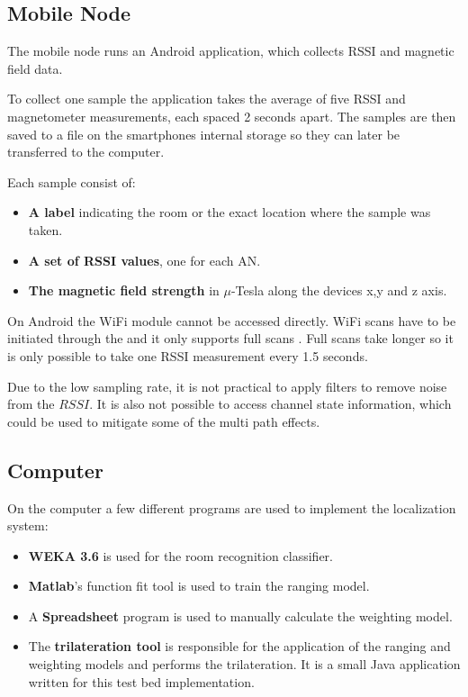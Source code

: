 \subsection{Mobile Node}

The mobile node runs an Android application, which collects RSSI and magnetic field data.

To collect one sample the application takes the average of five RSSI and magnetometer measurements, each spaced 2 seconds apart. The samples are then saved to a  file on the smartphones internal storage so they can later be transferred to the computer.

Each sample consist of:
\begin{itemize}
\item \textbf{A label} indicating the room or the exact location where the sample was taken.
\item \textbf{A set of RSSI values}, one for each AN.
\item \textbf{The magnetic field strength} in \(\mu\)-Tesla along the devices x,y and z axis.
\end{itemize}

On Android the WiFi module cannot be accessed directly. WiFi scans have to be initiated through the  and it only supports full scans \cite{brouwers2014incremental}. Full scans take longer so it is only possible to take one RSSI measurement every 1.5 seconds.

Due to the low sampling rate, it is not practical to apply filters to remove noise from the $RSSI$. It is also not possible to access channel state information, which could be used to mitigate some of the multi path effects.

\subsection{Computer}

On the computer a few different programs are used to implement the localization system:
\begin{itemize}
\item \textbf{WEKA 3.6} is used for the room recognition classifier.

\item \textbf{Matlab}'s function fit tool is used to train the ranging model.

\item A \textbf{Spreadsheet} program is used to manually calculate the weighting model.


\item The \textbf{trilateration tool} \cite{trilaterationTool} is responsible for the application of the ranging and weighting models and performs the trilateration. It is a small Java application written for this test bed implementation.

\end{itemize}

